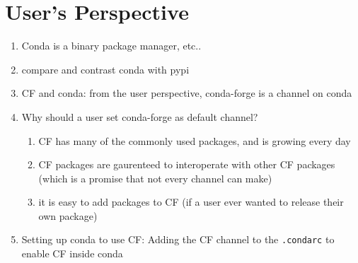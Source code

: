 \documentclass[fleqn,10pt,lineno]{wlpeerj} %
\newcounter{saveenumi}
\newcommand{\seti}{\setcounter{saveenumi}{\value{enumi}}}
\newcommand{\conti}{\setcounter{enumi}{\value{saveenumi}}}
\begin{document}
\section*{User's Perspective}
\begin{enumerate}\conti
\item Conda is a binary package manager, etc..
\item compare and contrast conda with pypi
\item CF and conda:  from the user perspective, conda-forge is a channel on conda
\item Why should a user set conda-forge as default channel?
\begin{enumerate}
\item CF has many of the commonly used packages, and is growing every day
\item CF packages are gaurenteed to interoperate with other CF packages
(which is a promise that not every channel can make)
\item it is easy to add packages to CF (if a user ever wanted to release their
own package)
\end{enumerate}
\item Setting up conda to use CF: Adding the CF channel to the \texttt{.condarc} to enable CF
inside conda
\end{enumerate}\seti
\end{document}
